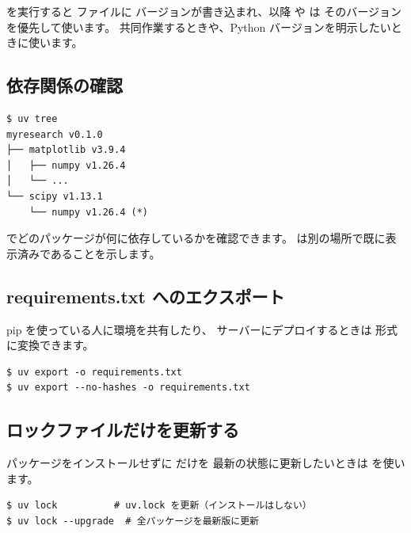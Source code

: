  を実行すると  ファイルに
バージョンが書き込まれ、以降  や  は
そのバージョンを優先して使います。
共同作業するときや、Python バージョンを明示したいときに使います。

\subsection{依存関係の確認}

\begin{wslbox}[依存関係ツリーの表示]
\begin{lstlisting}[style=bash]
$ uv tree
myresearch v0.1.0
├── matplotlib v3.9.4
│   ├── numpy v1.26.4
│   └── ...
└── scipy v1.13.1
    └── numpy v1.26.4 (*)
\end{lstlisting}
\end{wslbox}

 でどのパッケージが何に依存しているかを確認できます。
\cmd{(*)} は別の場所で既に表示済みであることを示します。

\subsection{requirements.txt へのエクスポート}

pip を使っている人に環境を共有したり、
サーバーにデプロイするときは  形式に変換できます。

\begin{wslbox}
\begin{lstlisting}[style=bash]
$ uv export -o requirements.txt
$ uv export --no-hashes -o requirements.txt
\end{lstlisting}
\end{wslbox}

\subsection{ロックファイルだけを更新する}

パッケージをインストールせずに  だけを
最新の状態に更新したいときは  を使います。

\begin{wslbox}
\begin{lstlisting}[style=bash]
$ uv lock          # uv.lock を更新（インストールはしない）
$ uv lock --upgrade  # 全パッケージを最新版に更新
\end{lstlisting}
\end{wslbox}

